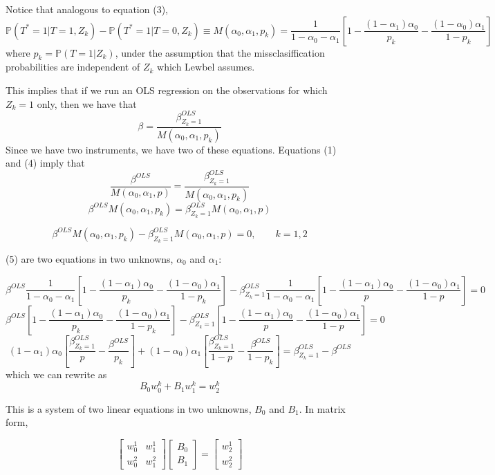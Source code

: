 Notice that analogous to equation (3), 
\[
\mathbb{P}(T^{*}=1|T=1,Z_{k})-\mathbb{P}(T^{*}=1|T=0,Z_{k})\equiv M(\alpha_{0},\alpha_{1},p_{k})=\frac{1}{1-\alpha_{0}-\alpha_{1}}\left[1-\frac{(1-\alpha_{1})\alpha_{0}}{p_{k}}-\frac{(1-\alpha_{0})\alpha_{1}}{1-p_{k}}\right]
\]
where $p_{k}=\mathbb{P}(T=1|Z_{k})$, under the assumption that the
missclasiffication probabilities are independent of $Z_{k}$ which
Lewbel assumes.

This implies that if we run an OLS regression on the observations
for which $Z_{k}=1$ only, then we have that 
\begin{equation}
\beta=\frac{\beta_{Z_{k}=1}^{OLS}}{M(\alpha_{0},\alpha_{1},p_{k})}
\end{equation}
Since we have two instruments, we have two of these equations. Equations
(1) and (4) imply that 
\[
\frac{\beta^{OLS}}{M(\alpha_{0},\alpha_{1},p)}=\frac{\beta_{Z_{k}=1}^{OLS}}{M(\alpha_{0},\alpha_{1},p_{k})}
\]
\[
\beta^{OLS}M(\alpha_{0},\alpha_{1},p_{k})=\beta_{Z_{k}=1}^{OLS}M(\alpha_{0},\alpha_{1},p)
\]


\begin{equation}
\beta^{OLS}M(\alpha_{0},\alpha_{1},p_{k})-\beta_{Z_{k}=1}^{OLS}M(\alpha_{0},\alpha_{1},p)=0,\qquad k=1,2
\end{equation}


(5) are two equations in two unknowns, $\alpha_{0}$ and $\alpha_{1}$:

\[
\beta^{OLS}\frac{1}{1-\alpha_{0}-\alpha_{1}}\left[1-\frac{(1-\alpha_{1})\alpha_{0}}{p_{k}}-\frac{(1-\alpha_{0})\alpha_{1}}{1-p_{k}}\right]-\beta_{Z_{k}=1}^{OLS}\frac{1}{1-\alpha_{0}-\alpha_{1}}\left[1-\frac{(1-\alpha_{1})\alpha_{0}}{p}-\frac{(1-\alpha_{0})\alpha_{1}}{1-p}\right]=0
\]
\[
\beta^{OLS}\left[1-\frac{(1-\alpha_{1})\alpha_{0}}{p_{k}}-\frac{(1-\alpha_{0})\alpha_{1}}{1-p_{k}}\right]-\beta_{Z_{k}=1}^{OLS}\left[1-\frac{(1-\alpha_{1})\alpha_{0}}{p}-\frac{(1-\alpha_{0})\alpha_{1}}{1-p}\right]=0
\]
\[
(1-\alpha_{1})\alpha_{0}\left[\frac{\beta_{Z_{k}=1}^{OLS}}{p}-\frac{\beta^{OLS}}{p_{k}}\right]+(1-\alpha_{0})\alpha_{1}\left[\frac{\beta_{Z_{k}=1}^{OLS}}{1-p}-\frac{\beta^{OLS}}{1-p_{k}}\right]=\beta_{Z_{k}=1}^{OLS}-\beta^{OLS}
\]
which we can rewrite as 
\[
B_{0}w_{0}^{k}+B_{1}w_{1}^{k}=w_{2}^{k}
\]


This is a system of two linear equations in two unknowns, $B_{0}$
and $B_{1}$. In matrix form,

\[
\left[\begin{array}{cc}
w_{0}^{1} & w{}_{1}^{1}\\
w_{0}^{2} & w_{1}^{2}
\end{array}\right]\left[\begin{array}{c}
B_{0}\\
B_{1}
\end{array}\right]=\left[\begin{array}{c}
w_{2}^{1}\\
w_{2}^{2}
\end{array}\right]
\]


